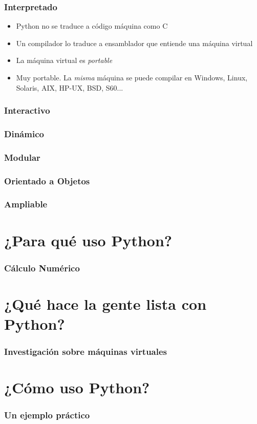 \documentclass[12pt,mathserif,compress]{beamer}
\begin{document}
\begin{frame}
  \frametitle{Interpretado}
  \begin{itemize}
  \item Python no se traduce a código máquina como C 
  \item Un compilador lo traduce a ensamblador que entiende una
    máquina virtual
  \item La máquina virtual es \emph{portable}
\pause
\item Muy portable. La \emph{misma} máquina se puede compilar en \pause
  Windows, \pause Linux, \pause Solaris, \pause AIX, \pause HP-UX,
  \pause BSD, \pause S60...
  \end{itemize}
\end{frame}

\begin{frame}
  \frametitle{Interactivo}
\end{frame}

\begin{frame}
  \frametitle{Dinámico}
\end{frame}

\begin{frame}
  \frametitle{Modular}
\end{frame}

\begin{frame}
  \frametitle{Orientado a Objetos}
\end{frame}

\begin{frame}
  \frametitle{Ampliable}
\end{frame}

\section{¿Para qué uso Python?}
\begin{frame}
  \frametitle{Cálculo Numérico}
\end{frame}

\section{¿Qué hace la gente lista con Python?}

\begin{frame}
  \frametitle{Investigación sobre máquinas virtuales}
\end{frame}
\section{¿Cómo uso Python?}

\begin{frame}
  \frametitle{Un ejemplo práctico}
\end{frame}
\end{document}
